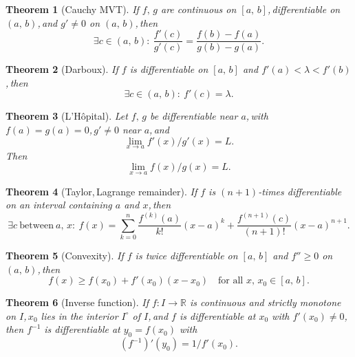 \documentclass[11pt,reqno]{amsart}
\providecommand{\R}{\mathbb{R}}
\newcommand{\comma}{,\,\allowbreak}
\theoremstyle{redplain}
\newtheorem{theorem}{Theorem}
\begin{document}
\begin{theorem}[Cauchy MVT]
	\label{thm:cauchy-mvt}
	If $f\comma g$ are continuous on $[a\comma b]$\comma differentiable on $(a\comma b)$\comma and $g'\ne0$ on $(a\comma b)$\comma then
	\begin{equation}\label{eq:cauchy-mvt}
	\exists c\in(a\comma b):\ \frac{f'(c)}{g'(c)}=\frac{f(b)-f(a)}{g(b)-g(a)}.
	\end{equation}
\end{theorem}

\begin{theorem}[Darboux]
	\label{thm:darboux}
	If $f$ is differentiable on $[a\comma b]$ and $f'(a)<\lambda<f'(b)$\comma then
	\begin{equation}\label{eq:darboux}
	\exists c\in(a\comma b):\ f'(c)=\lambda.
	\end{equation}
\end{theorem}

\begin{theorem}[L'H\^opital]
	\label{thm:lhopital}
	Let $f\comma g$ be differentiable near $a$\comma with $f(a)=g(a)=0$\comma $g'\ne0$ near $a$\comma and $$\lim_{x\to a}f'(x)/g'(x)=L.$$ Then
	\begin{equation}\label{eq:lhopital}
	\lim_{x\to a}f(x)/g(x)=L.
	\end{equation}
\end{theorem}

\begin{theorem}[Taylor\comma Lagrange remainder]
	\label{thm:taylor}
	If $f$ is $(n+1)$-times differentiable on an interval containing $a$ and $x$\comma then
	\begin{equation}\label{eq:taylor}
	\exists c\ \text{between}\ a\comma x:\ f(x)=\sum_{k=0}^{n}\frac{f^{(k)}(a)}{k!}(x-a)^{k}+\frac{f^{(n+1)}(c)}{(n+1)!}(x-a)^{n+1}.
	\end{equation}
\end{theorem}

\begin{theorem}[Convexity]
	\label{thm:convexity}
	If $f$ is twice differentiable on $[a\comma b]$ and $f''\ge0$ on $(a\comma b)$\comma then
	\begin{equation}\label{eq:convexity}
	f(x)\ge f(x_0)+f'(x_0)(x-x_0)\quad\text{for all }x\comma x_0\in[a\comma b].
	\end{equation}
\end{theorem}

\begin{theorem}[Inverse function]
	\label{thm:inverse}
	If $f:I\to\R$ is continuous and strictly monotone on $I$\comma $x_0$ lies in the interior $I^\circ$ of $I$\comma and $f$ is differentiable at $x_0$ with $f'(x_0)\ne0$\comma then $f^{-1}$ is differentiable at $y_0=f(x_0)$ with
	\begin{equation}\label{eq:inverse}
	(f^{-1})'(y_0)=1/f'(x_0).
	\end{equation}
\end{theorem}
\end{document}
